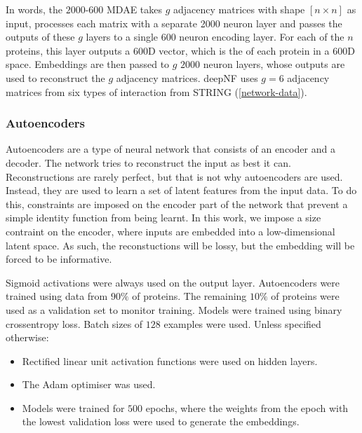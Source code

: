 In words, the $2000$-$600$ MDAE takes $g$ adjacency matrices with shape $[n \times n]$ as input,
processes each matrix with a separate 2000 neuron layer and passes the outputs of these $g$ layers to a single $600$ neuron encoding layer.
For each of the $n$ proteins, this layer outputs a $600$D vector, which is the of each protein in a $600$D space.
Embeddings are then passed to $g$ $2000$ neuron layers, whose outputs are used to reconstruct the $g$ adjacency matrices.
deepNF uses $g=6$ adjacency matrices from six types of interaction from STRING (\ref{network-data}).

\subsubsection{Autoencoders}
\label{autoencoder}


Autoencoders are a type of neural network that consists of an encoder and a decoder.
The network tries to reconstruct the input as best it can.
Reconstructions are rarely perfect, but that is not why autoencoders are used.
Instead, they are used to learn a set of latent features from the input data.
To do this, constraints are imposed on the encoder part of the network that prevent a simple identity function from being learnt.
In this work, we impose a size contraint on the encoder, where inputs are embedded into a low-dimensional latent space.
As such, the reconstuctions will be lossy, but the embedding will be forced to be informative.

Sigmoid activations were always used on the output layer.
Autoencoders were trained using data from $90\%$ of proteins.
The remaining $10\%$ of proteins were used as a validation set to monitor training.
Models were trained using binary crossentropy loss.
Batch sizes of $128$ examples were used.
Unless specified otherwise:

\begin{itemize}
    \item Rectified linear unit activation functions were used on hidden layers.
    \item The Adam optimiser \cite{Kingma2014} was used.
    \item Models were trained for $500$ epochs, where the weights from the epoch with the lowest validation loss were used to generate the embeddings.
\end{itemize}

